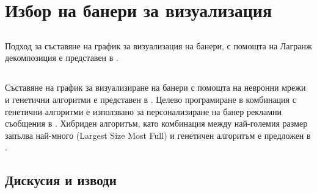 \chapter{Избор на банери за визуализация}

\section{}

Подход за съставяне на график за визуализация на банери, с помощта на Лагранж декомпозиция е представен в \cite{10.1145/945846.945848}.

\section{}

Съставяне на график за визуализиране на банери с помощта на невронни мрежи и генетични алгоритми е представен в \cite{DEANE20125168}. Целево програмиране в комбинация с генетични алгоритми е използвано за персонализиране на банер рекламни съобщения в \cite{KARUGA200185}. Хибриден алгоритъм, като комбинация между най-големия размер запълва най-много (Largest Size Most Full) и генетичен алгоритъм е предложен в \cite{KUMAR20061067}.

\section{}

\section{Дискусия и изводи}
